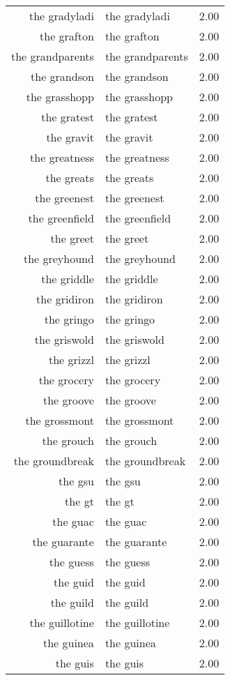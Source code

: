 \begin{table}[ht]
\begin{tabular}{rlr}
  the gradyladi & the gradyladi & 2.00 \\ 
  the grafton & the grafton & 2.00 \\ 
  the grandparents & the grandparents & 2.00 \\ 
  the grandson & the grandson & 2.00 \\ 
  the grasshopp & the grasshopp & 2.00 \\ 
  the gratest & the gratest & 2.00 \\ 
  the gravit & the gravit & 2.00 \\ 
  the greatness & the greatness & 2.00 \\ 
  the greats & the greats & 2.00 \\ 
  the greenest & the greenest & 2.00 \\ 
  the greenfield & the greenfield & 2.00 \\ 
  the greet & the greet & 2.00 \\ 
  the greyhound & the greyhound & 2.00 \\ 
  the griddle & the griddle & 2.00 \\ 
  the gridiron & the gridiron & 2.00 \\ 
  the gringo & the gringo & 2.00 \\ 
  the griswold & the griswold & 2.00 \\ 
  the grizzl & the grizzl & 2.00 \\ 
  the grocery & the grocery & 2.00 \\ 
  the groove & the groove & 2.00 \\ 
  the grossmont & the grossmont & 2.00 \\ 
  the grouch & the grouch & 2.00 \\ 
  the groundbreak & the groundbreak & 2.00 \\ 
  the gsu & the gsu & 2.00 \\ 
  the gt & the gt & 2.00 \\ 
  the guac & the guac & 2.00 \\ 
  the guarante & the guarante & 2.00 \\ 
  the guess & the guess & 2.00 \\ 
  the guid & the guid & 2.00 \\ 
  the guild & the guild & 2.00 \\ 
  the guillotine & the guillotine & 2.00 \\ 
  the guinea & the guinea & 2.00 \\ 
  the guis & the guis & 2.00 \\ 

\end{tabular}
\end{table}
